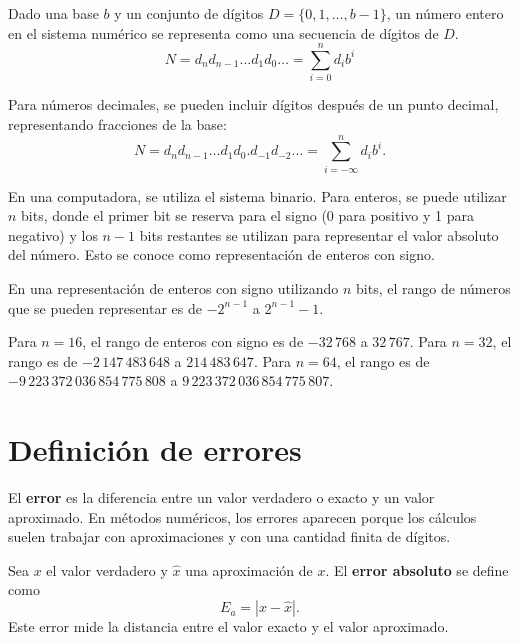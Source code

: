 \documentclass[a4,11pt]{aleph-notas}
\begin{document}
\begin{defi}
    Dado una base $b$ y un conjunto de dígitos $D = \{0, 1, \ldots, b-1\}$, un número entero en el sistema numérico se representa como una secuencia de dígitos de $D$.
    \[
    N = d_n d_{n-1} \ldots d_1 d_0 \ldots = \sum_{i=0}^{n} d_i b^i
    \]

    Para números decimales, se pueden incluir dígitos después de un punto decimal, representando fracciones de la base:
    \[
    N = d_n d_{n-1} \ldots d_1 d_0 . d_{-1} d_{-2} \ldots = \sum_{i=-\infty}^{n} d_i b^i.
    \]
\end{defi}


En una computadora, se utiliza el sistema binario. Para enteros, se puede utilizar $n$ bits, donde el primer bit se reserva para el signo (0 para positivo y 1 para negativo) y los $n-1$ bits restantes se utilizan para representar el valor absoluto del número. Esto se conoce como representación de enteros con signo.

\begin{defi}
    En una representación de enteros con signo utilizando $n$ bits, el rango de números que se pueden representar es de $-2^{n-1}$ a $2^{n-1}-1$.
\end{defi}

\begin{advertencia}
    Para $n=16$, el rango de enteros con signo es de $-32\,768$ a $32\,767$. Para $n=32$, el rango es de $-2\,147\,483\,648$ a $214\,483\,647$. Para $n=64$, el rango es de $-9\,223\,372\,036\,854\,775\,808$ a $9\,223\,372\,036\,854\,775\,807$.
\end{advertencia}


\section{Definición de errores}

\begin{defi}[Error]
    El \textbf{error} es la diferencia entre un valor verdadero o exacto y un valor aproximado. En métodos numéricos, los errores aparecen porque los cálculos suelen trabajar con aproximaciones y con una cantidad finita de dígitos.
\end{defi}

\begin{defi}
    Sea $x$ el valor verdadero y $\widehat{x}$ una aproximación de $x$. El \textbf{error absoluto} se define como
    \[
        E_a = |x-\widehat{x}|.
    \]
    Este error mide la distancia entre el valor exacto y el valor aproximado.
\end{defi}
\end{document}
